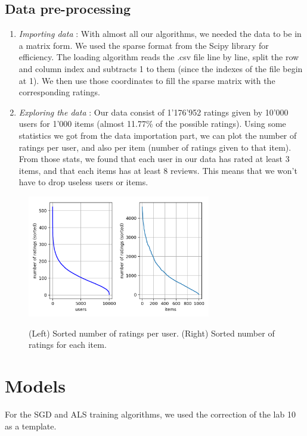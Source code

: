 \documentclass[a4paper]{article}
\begin{document}
\subsection{Data pre-processing}
\begin{enumerate}
\item \textit{Importing data} : With almost all our algorithms, we needed the data to be in a matrix form. We used the sparse format from the Scipy library for efficiency. The loading algorithm reads the .csv file line by line, split the row and column index and subtracts 1 to them (since the indexes of the file begin at 1). We then use those coordinates to fill the sparse matrix with the corresponding ratings.

\item \textit{Exploring the data} : Our data consist of 1'176'952 ratings given by 10'000 users for 1'000 items (almost 11.77\% of the possible ratings). Using some statistics we got from the data importation part, we can plot the number of ratings per user, and also per item (number of ratings given to that item). From those stats, we found that each user in our data has rated at least 3 items, and that each items has at least 8 reviews. This means that we won't have to drop useless users or items. 
\end{enumerate}

\begin{figure}[h]
  \centering
  \includegraphics[width=8cm]{stat_ratings.png}
  \label{fig:figure 1}
  \caption{(Left) Sorted number of ratings per user. (Right) Sorted number of ratings for each item.}
\end{figure}



\section{Models}
For the SGD and ALS training algorithms, we used the correction of the lab 10 as a template.
\end{document}
